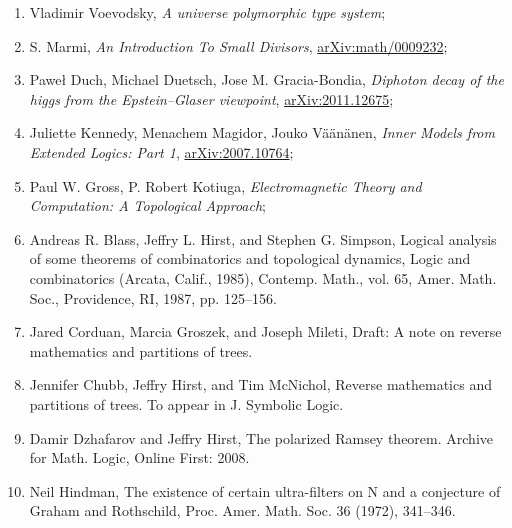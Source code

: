 \documentclass[a4paper,11pt]{article}
\begin{document}
\begin{enumerate}
\item Vladimir Voevodsky, \textit{A universe polymorphic type system};



\item S. Marmi, \textit{An Introduction To Small Divisors},
  \href{https://arxiv.org/abs/math/0009232v1}{arXiv:math/0009232};



\item Paweł Duch, Michael Duetsch, Jose M. Gracia-Bondia,
  \textit{Diphoton decay of the higgs from the Epstein--Glaser
    viewpoint},
  \href{https://arxiv.org/abs/2011.12675v2}{arXiv:2011.12675};



\item Juliette Kennedy, Menachem Magidor, Jouko V\"{a}\"{a}n\"{a}nen,
  \textit{Inner Models from Extended Logics: Part 1},
  \href{https://arxiv.org/abs/2007.10764}{arXiv:2007.10764};



\item Paul W. Gross, P. Robert Kotiuga, \textit{Electromagnetic Theory
    and Computation: A Topological Approach};



\item Andreas R. Blass, Jeffry L. Hirst, and Stephen G. Simpson,
  Logical analysis of some theorems of combinatorics and topological
  dynamics, Logic and combinatorics (Arcata, Calif., 1985), Contemp.
  Math., vol. 65, Amer. Math. Soc., Providence, RI, 1987, pp. 125–156.



\item Jared Corduan, Marcia Groszek, and Joseph Mileti, Draft: A note
  on reverse mathematics and partitions of trees.



\item Jennifer Chubb, Jeffry Hirst, and Tim McNichol, Reverse
  mathematics and partitions of trees. To appear in J. Symbolic Logic.



\item Damir Dzhafarov and Jeffry Hirst, The polarized Ramsey theorem.
  Archive for Math. Logic, Online First: 2008.



\item Neil Hindman, The existence of certain ultra-filters on N and a
  conjecture of Graham and Rothschild, Proc. Amer. Math. Soc. 36
  (1972), 341–346.




\end{enumerate}
\end{document}
